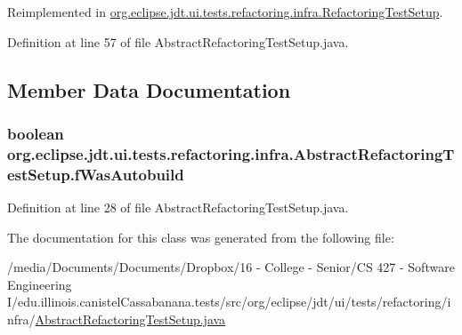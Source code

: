 Reimplemented in \hyperlink{classorg_1_1eclipse_1_1jdt_1_1ui_1_1tests_1_1refactoring_1_1infra_1_1RefactoringTestSetup_a6d6dd64f8b23fd51e3e18ab2b01b9556}{org.eclipse.jdt.ui.tests.refactoring.infra.RefactoringTestSetup}.



Definition at line 57 of file AbstractRefactoringTestSetup.java.



\subsection{Member Data Documentation}
\hypertarget{classorg_1_1eclipse_1_1jdt_1_1ui_1_1tests_1_1refactoring_1_1infra_1_1AbstractRefactoringTestSetup_a8dc0ef580a0de217e829d4849f917e77}{
\subsubsection[{fWasAutobuild}]{\setlength{\rightskip}{0pt plus 5cm}boolean {\bf org.eclipse.jdt.ui.tests.refactoring.infra.AbstractRefactoringTestSetup.fWasAutobuild}}}
\label{classorg_1_1eclipse_1_1jdt_1_1ui_1_1tests_1_1refactoring_1_1infra_1_1AbstractRefactoringTestSetup_a8dc0ef580a0de217e829d4849f917e77}


Definition at line 28 of file AbstractRefactoringTestSetup.java.



The documentation for this class was generated from the following file:\begin{DoxyCompactItemize}
\item 
/media/Documents/Documents/Dropbox/16 -\/ College -\/ Senior/CS 427 -\/ Software Engineering I/edu.illinois.canistelCassabanana.tests/src/org/eclipse/jdt/ui/tests/refactoring/infra/\hyperlink{AbstractRefactoringTestSetup_8java}{AbstractRefactoringTestSetup.java}\end{DoxyCompactItemize}

